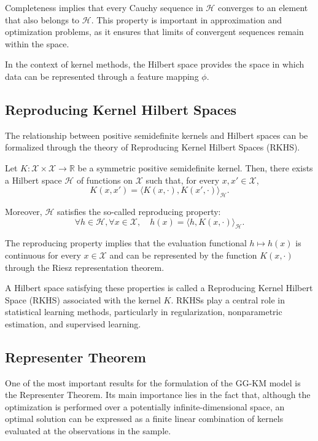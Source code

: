 Completeness implies that every Cauchy sequence in $\mathcal{H}$ converges
to an element that also belongs to $\mathcal{H}$. This property is important
in approximation and optimization problems, as it ensures that limits of
convergent sequences remain within the space.

In the context of kernel methods, the Hilbert space provides the space in
which data can be represented through a feature mapping $\phi$.

\subsection{Reproducing Kernel Hilbert Spaces}

The relationship between positive semidefinite kernels and Hilbert spaces
can be formalized through the theory of Reproducing Kernel Hilbert Spaces
(RKHS).

Let $K: \mathcal{X} \times \mathcal{X} \to \mathbb{R}$ be a symmetric
positive semidefinite kernel. Then, there exists a Hilbert space
$\mathcal{H}$ of functions on $\mathcal{X}$ such that, for every
$x,x' \in \mathcal{X}$,
\begin{equation}
K(x,x')
=
\langle K(x,\cdot), K(x',\cdot) \rangle_{\mathcal{H}}.
\end{equation}

Moreover, $\mathcal{H}$ satisfies the so-called reproducing property:
\begin{equation}
\forall h \in \mathcal{H}, \forall x \in \mathcal{X}, \quad
h(x)
=
\langle h, K(x,\cdot)\rangle_{\mathcal{H}}.
\end{equation}

The reproducing property implies that the evaluation functional
$h \mapsto h(x)$ is continuous for every $x \in \mathcal{X}$ and can be
represented by the function $K(x,\cdot)$ through the Riesz representation
theorem.

A Hilbert space satisfying these properties is called a Reproducing Kernel
Hilbert Space (RKHS) associated with the kernel $K$. RKHSs play a central
role in statistical learning methods, particularly in regularization,
nonparametric estimation, and supervised learning.

\subsection{Representer Theorem}

One of the most important results for the formulation of the GG-KM model
is the Representer Theorem. Its main importance lies in the fact that,
although the optimization is performed over a potentially infinite-dimensional
space, an optimal solution can be expressed as a finite linear combination
of kernels evaluated at the observations in the sample.

